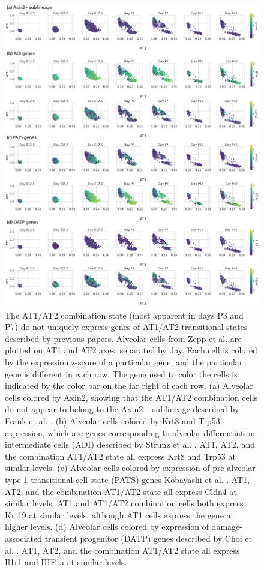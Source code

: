 \documentclass[aps,superscriptaddress, notitlepage,longbibliography]{revtex4-1}
\begin{document}
\begin{figure}
	\label{LungMAP}
\end{figure}




\begin{figure}
	\centering
		\includegraphics[scale=0.8]{figs/LungMAP genes.png}
	\caption{The AT1/AT2 combination state (most apparent in days P3 and P7) do not uniquely express genes of AT1/AT2 transitional states described by previous papers. Alveolar cells from Zepp et al. are plotted on AT1 and AT2 axes, separated by day. Each cell is colored by the expression z-score of a particular gene, and the particular gene is different in each row. The gene used to color the cells is indicated by the color bar on the far right of each row. (a) Alveolar cells colored by Axin2, showing that the AT1/AT2 combination cells do not appear to belong to the Axin2+ sublineage described by Frank et al. \cite{frank2016emergence}. (b) Alveolar cells colored by Krt8 and Trp53 expression, which are genes corresponding to alveolar differentiation intermediate cells (ADI) described by Strunz et al. \cite{strunz2020alveolar}. AT1, AT2, and the combination AT1/AT2 state all express Krt8 and Trp53 at similar levels. (c) Alveolar cells colored by expression of pre-alveolar type-1 transitional cell state (PATS) genes Kobayashi et al. \cite{kobayashi2020persistence}. AT1, AT2, and the combination AT1/AT2 state all express Cldn4 at similar levels. AT1 and AT1/AT2 combination cells both express Krt19 at similar levels, although AT1 cells express the gene at higher levels. (d) Alveolar cells colored by expression of damage-associated transient progenitor (DATP) genes described by Choi et al. \cite{choi2020inflammatory}. AT1, AT2, and the combination AT1/AT2 state all express Il1r1 and HIF1a at similar levels. }
	\label{LungMAP genes}
\end{figure}
\end{document}
